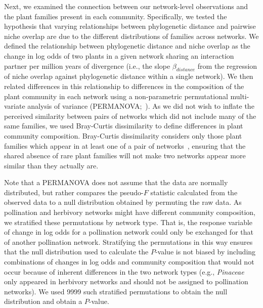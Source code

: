 \documentclass[12pt]{article}
\begin{document}
\begin{spacing}{1.5}
    Next, we examined the connection between our network-level observations
    and the plant families present in each community.
    Specifically, we tested the hypothesis that
    varying relationships between phylogenetic distance and
    pairwise niche overlap are due to the different distributions 
    of families across networks. We defined the relationship between
    phylogenetic distance and niche overlap as the change in 
    log odds of two plants in a given network sharing an interaction 
    partner per million years of divergence (i.e., the slope $\beta_{distance}$ from the 
    regression of niche overlap against phylogenetic distance within
    a single network). We then related differences in this relationship
    to differences in the composition of the plant community in each
    network using a non-parametric permutational multi-variate 
    analysis of variance (PERMANOVA;~\citealp{Anderson2001}).
    As we did not wish to inflate the perceived similarity between
    pairs of networks which did not include many of the same families,
    we used Bray-Curtis dissimilarity to define differences in plant
    community composition. Bray-Curtis dissimilarity considers only
    those plant families which appear in at least one of a pair of
    networks~\citep{Anderson2001,Cirtwill2015}, ensuring that the
    shared absence of rare plant families will not make 
    two networks appear more similar than they actually are. 


    Note that a PERMANOVA does not assume that the data are 
    normally distributed, but rather compares the pseudo-$F$ 
    statistic calculated from the observed data to a null 
    distribution obtained by permuting the raw data. As 
    pollination and herbivory networks might have different
    community composition, we stratified these permutations
    by network type. That is, the response variable of change in log odds for a pollination
    network could only be exchanged for that of another pollination
    network. Stratifying the permutations in this way ensures that 
    the null distribution used to calculate the $P$-value is not 
    biased by including combinations of changes in log odds and 
    community composition that would not occur because of inherent 
    differences in the two network types (e.g., \emph{Pinaceae} 
    only appeared in herbivory networks and should not be assigned 
    to pollination networks). We used 9999 such stratified permutations 
    to obtain the null distribution and obtain a $P$-value.


\end{spacing}
\end{document}
